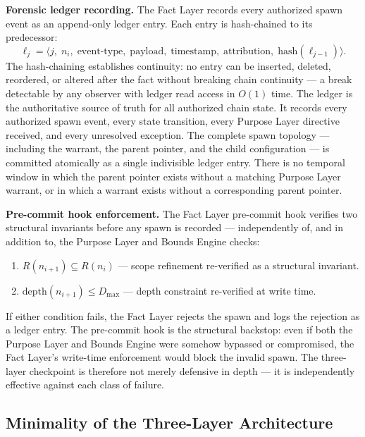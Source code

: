 \medskip
\noindent\textbf{Forensic ledger recording.} The Fact Layer records every authorized spawn event as an append-only ledger entry. Each entry is hash-chained to its predecessor:
\begin{equation}
\ell_j = \bigl\langle j,\; n_i,\; \text{event-type},\; \text{payload},\; \text{timestamp},\; \text{attribution},\; \text{hash}(\ell_{j-1}) \bigr\rangle .
\label{eq:rs-ledger-entry}
\end{equation}
The hash-chaining establishes continuity: no entry can be inserted, deleted, reordered, or altered after the fact without breaking chain continuity — a break detectable by any observer with ledger read access in $O(1)$ time. The ledger is the authoritative source of truth for all authorized chain state. It records every authorized spawn event, every state transition, every Purpose Layer directive received, and every unresolved exception. The complete spawn topology — including the warrant, the parent pointer, and the child configuration — is committed atomically as a single indivisible ledger entry. There is no temporal window in which the parent pointer exists without a matching Purpose Layer warrant, or in which a warrant exists without a corresponding parent pointer.

\medskip
\noindent\textbf{Pre-commit hook enforcement.} The Fact Layer pre-commit hook verifies two structural invariants before any spawn is recorded — independently of, and in addition to, the Purpose Layer and Bounds Engine checks:

\begin{enumerate}
    \item[(FC1)] $R(n_{i+1}) \subseteq R(n_i)$ — scope refinement re-verified as a structural invariant.
    \item[(FC2)] $\text{depth}(n_{i+1}) \leq D_{\mathrm{max}}$ — depth constraint re-verified at write time.
\end{enumerate}

If either condition fails, the Fact Layer rejects the spawn and logs the rejection as a ledger entry. The pre-commit hook is the structural backstop: even if both the Purpose Layer and Bounds Engine were somehow bypassed or compromised, the Fact Layer's write-time enforcement would block the invalid spawn. The three-layer checkpoint is therefore not merely defensive in depth — it is independently effective against each class of failure.

\subsection{Minimality of the Three-Layer Architecture}
\label{sec:rs-layer-minimality}

